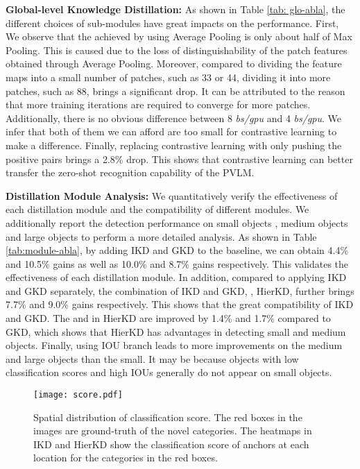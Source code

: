 \documentclass[10pt,twocolumn,letterpaper]{article}
\begin{document}
\noindent \textbf{Global-level Knowledge Distillation:} As shown in Table \ref{tab: glo-abla}, the different choices of sub-modules have great impacts on the performance. First, We observe that the  achieved by using Average Pooling is only about half of Max Pooling. This is caused due to the loss of distinguishability of the patch features obtained through Average Pooling. Moreover, compared to dividing the feature maps into a small number of patches, such as 33 or 44, dividing it into more patches, such as 88, brings a significant  drop. It can be attributed to the reason that more training iterations are required to converge for more patches. Additionally, there is no obvious difference between 8 \textit{bs/gpu} and 4 \textit{bs/gpu}. We infer that both of them we can afford are too small for contrastive learning to make a difference. Finally, replacing contrastive learning with only pushing the positive pairs brings a 2.8\%  drop. This shows that contrastive learning can better transfer the zero-shot recognition capability of the PVLM.



\noindent \textbf{Distillation Module Analysis:} We quantitatively verify the effectiveness of each distillation module and the compatibility of different modules. We additionally report the detection performance on small objects , medium objects  and large objects  to perform a more detailed analysis. As shown in Table \ref{tab:module-abla}, by adding IKD and GKD to the baseline, we can obtain 4.4\% and 10.5\%  gains as well as 10.0\% and 8.7\%  gains respectively. This validates the effectiveness of each distillation module. 
In addition, compared to applying IKD and GKD separately, the combination of IKD and GKD, \ie, HierKD, further brings 7.7\% and 9.0\%  gains respectively. This shows that the great compatibility of IKD and GKD. The  and  in HierKD are improved by 1.4\% and 1.7\% compared to GKD, which shows that HierKD has advantages in detecting small and medium objects.  
Finally, using IOU branch leads to more improvements on the medium and large objects than the small. It may be because objects with low classification scores and high IOUs generally do not appear on small objects.


\begin{figure}[t]
\centering
\small
\texttt{[image: score.pdf]}
\caption{Spatial distribution of classification score. The red boxes in the images are ground-truth of the novel categories. The heatmaps in IKD and HierKD show the classification score of anchors at each location for the categories in the red boxes.}
\label{fig:score}
\vspace{-0.4em}
\end{figure}
\end{document}
